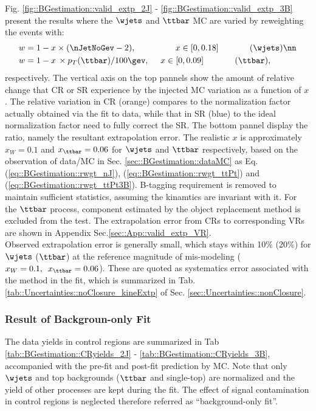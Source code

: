 Fig. \ref{fig::BGestimation::valid_extp_2J} - \ref{fig::BGestimation::valid_extp_3B} present the results where the $\wjets$ and $\ttbar$ MC are varied by reweighting the events with:
\begin{align}
 w & = 1 - x \times (\nJetNoGev-2), \mbox{\phantom{MMMM}}\,\,\,\,\,\, x \in [0,0.18]  \mbox{\phantom{MMMM}} (\wjets) \nn  \\
 w & = 1 - x \,\times p_T(\ttbar)/100\gev, \,\,\,\,\,\,\,\,           x \in [0,0.09]  \mbox{\phantom{MMMM}} (\ttbar),
\label{eq::BGestimation::injected_MCvariation}
\end{align}
respectively. The vertical axis on the top pannels show the amount of relative change that CR or SR experience by the injected MC variation as a function of $x$. The relative variation in CR (orange) compares to the normalization factor actually obtained via the fit to data, while that in SR (blue) to the ideal normalization factor need to fully correct the SR. The bottom pannel display the ratio, namely the resultant extrapolation error. The realistic $x$ is approximately $x_W=0.1$ and $x_{\ttbar}=0.06$ for $\wjets$ and $\ttbar$ respectively, based on the observation of data/MC in Sec. \ref{sec::BGestimation::dataMC} as Eq. (\ref{eq::BGestimation::rwgt_nJ}), (\ref{eq::BGestimation::rwgt_ttPt}) and (\ref{eq::BGestimation::rwgt_ttPt3B}). B-tagging requirement is removed to maintain sufficient statistics, assuming the kinamtics are invariant with it. For the $\ttbar$ process, component estimated by the object replacement method is excluded from the test. The extrapolation error from CRs to corresponding VRs are shown in Appendix Sec.\ref{sec::App::valid_extp_VR}. \\

Observed extrapolation error is generally small, which stays within 10$\%$ (20$\%$) for $\wjets$ ($\ttbar$) at the reference magnitude of mis-modeling ($x_W=0.1, \,\,\, x_{\ttbar}=0.06$). These are quoted as systematics error associated with the method in the fit, which is summarized in Tab. \ref{tab::Uncertainties::noClosure_kineExtp} of Sec. \ref{sec::Uncertainties::nonClosure}. \\

\clearpage
%



\clearpage

\subsubsection{Result of Backgroun-only Fit} \label{sec::BGestimation::kineExtp::result}
The data yields in control regions are summarized in Tab \ref{tab::BGestimation::CRyields_2J} - \ref{tab::BGestimation::CRyields_3B}, accompanied with the pre-fit and post-fit prediction by MC. Note that only $\wjets$ and top backgrounds ($\ttbar$ and single-top) are normalized and the yield of other processes are kept during the fit. The effect of signal contamination in control regions is neglected therefore referred as ``background-only fit''. \\

